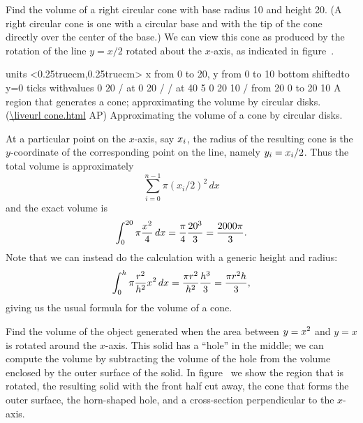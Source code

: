 \example
Find the volume of a right circular cone with base radius 10 and
height 20. (A right circular cone is one with a circular base and with
the tip of the cone directly over the center of the base.)
We can view this cone as produced by the rotation of the line
$y=x/2$ rotated about the $x$-axis, as indicated in
figure~.

\figure
\texonly
\vbox{\beginpicture
\normalgraphs
\ninepoint
\setcoordinatesystem units <0.25truecm,0.25truecm>
\setplotarea x from 0 to 20, y from 0 to 10
\axis bottom shiftedto y=0 ticks withvalues {$0$} {$20$} / at 0 20 / /
 at 40 5
 0 20 10 /
\putrule from 20 0 to 20 10
\endpicture}
\begincaption
A region that generates a cone; approximating the volume
by circular disks.
(\expandafter\url\expandafter{\liveurl cone.html}%
AP\endurl)
\endcaption
\endtexonly
{}
\begincaption
Approximating the volume of a cone
by circular disks.
\endcaption
\endfigure

At a particular point on the $x$-axis, say $\displaystyle x_i$, the radius of the
resulting cone is the $y$-coordinate of the corresponding point on the
line, namely $\displaystyle y_i=x_i/2$. Thus the total volume is approximately
$$\sum_{i=0}^{n-1} \pi (x_i/2)^2\,dx$$
and the exact volume is
$$
  \int_0^{20} \pi
  {x^2\over4}\,dx={\pi\over4}{20^3\over3}={2000\pi\over3}.
$$ 
Note that we can instead do the calculation with a generic height and
radius: 
$$
  \int_0^{h} \pi{r^2\over h^2}x^2\,dx
  ={\pi r^2\over h^2}{h^3\over3}={\pi r^2h\over3},
$$ 
giving us the usual formula for the volume of a cone.
\endexample

\example
Find the volume of the object generated when the area between
$\displaystyle y=x^2$ and $y=x$ is rotated around the $x$-axis. This solid has a
``hole'' in the middle; we can compute the volume by subtracting the
volume of the hole from the volume enclosed by the outer surface of
the solid. In figure~ we show the region
that is rotated, the resulting solid with the front half cut away,
the cone that forms the outer surface, the
horn-shaped hole, and a cross-section perpendicular to the $x$-axis.

